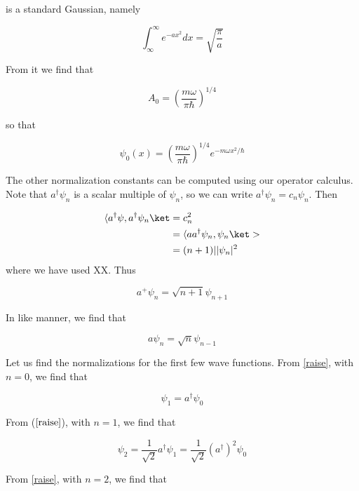 is a standard Gaussian, namely

\begin{equation}
\int_{\infty}^\infty e^{ -ax^2} dx = \sqrt{\frac{\pi}{a}}
\end{equation}

From it we find that

\begin{equation}
A_0 = \left(\frac{m\omega}{\pi\hbar}\right)^{1/4}
\end{equation}

so that

\begin{equation}
\psi_0(x) = \left(\frac{m\omega}{\pi\hbar}\right)^{1/4} e^{-m\omega x^2/\hbar}
\end{equation}

The other normalization constants can be computed using our operator calculus.
Note that $a^\dagger \psi_n$ is a scalar multiple of $\psi_n$, so we can write $a^\dagger\psi_n = c_n\psi_n$. Then

\begin{align}
\bra a^\dagger \psi, a^\dagger \psi_n \ket &= c_n^2 \\
&= \bra aa^\dagger \psi_n, \psi_n \ket> \\
&= (n+1)||\psi_n|^2
\end{align}
where we have used XX.  Thus

\begin{equation}
\label{raise}
a^+ \psi_n = \sqrt{n+1} \psi_{n+1}
\end{equation}

In like manner, we find that

\begin{equation}
a \psi_n = \sqrt{n} \psi_{n-1}
\end{equation}

Let us find the normalizations for the first few wave functions.  From \eqref{raise}, with $n = 0$, we find that

\begin{equation}
\psi_1 = a^\dagger \psi_0
\end{equation}

From ($\eqref{raise}$), with $n = 1$, we find that

\begin{equation}
\psi_2 = \frac{1}{\sqrt 2} a^\dagger \psi_1 
 = \frac{1}{\sqrt 2} ( a^\dagger )^2 \psi_0
\end{equation}

From \eqref{raise}, with $n = 2$, we find that

